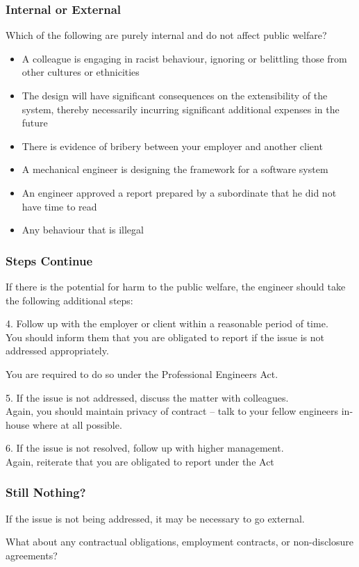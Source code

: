 \begin{frame}
\frametitle{Internal or External}
Which of the following are purely internal and do not affect public welfare?

\begin{itemize}
\item A colleague is engaging in racist behaviour, ignoring or belittling those from other cultures or ethnicities
\item The design will have significant consequences on the extensibility of the system, thereby necessarily incurring significant additional expenses in the future
\item There is evidence of bribery between your employer and another client
\item A mechanical engineer is designing the framework for a software system
\item An engineer approved a report prepared by a subordinate that he did not have time to read
\item Any behaviour that is illegal
\end{itemize}


\end{frame}




\begin{frame}
\frametitle{Steps Continue}

If there is the potential for harm to the public welfare, the engineer should take the following additional steps:

4. Follow up with the employer or client within a reasonable period of time.\\
\quad You should inform them that you are obligated to report if the issue is not addressed appropriately.

You are required to do so under the Professional Engineers Act.

5. If the issue is not addressed, discuss the matter with colleagues.\\
\quad Again, you should maintain privacy of contract -- talk to your fellow engineers in-house where at all possible.

6. If the issue is not resolved, follow up with higher management.\\
\quad Again, reiterate that you are obligated to report under the Act


\end{frame}



\begin{frame}
\frametitle{Still Nothing?}

If the issue is not being addressed, it may be necessary to go external.

What about any contractual obligations, employment contracts, or non-disclosure agreements?


\end{frame}



